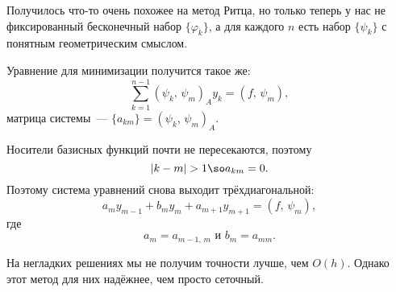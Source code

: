 \documentclass{trlnotes}
\begin{document}
    Получилось что-то очень похожее на метод Ритца, но только теперь у нас не фиксированный бесконечный набор $\{\varphi_k\}$, а для каждого $n$ есть набор $\{\psi_k\}$ с понятным геометрическим смыслом.

    Уравнение для минимизации получится такое же:
    \[
        \sum\limits_{k = 1}^{n - 1}(\psi_k, \, \psi_m)_A y_k = (f, \, \psi_m),
    \]
    матрица системы~--- $\{a_{km}\} = (\psi_k, \, \psi_m)_A$.

    Носители базисных функций почти не пересекаются, поэтому
    \[
        |k - m| > 1 \so a_{km} = 0.
    \]
    Поэтому система уравнений снова выходит трёхдиагональной:
    \[
        a_m y_{m - 1} + b_m y_m + a_{m + 1} y_{m + 1} = (f, \, \psi_m),
    \]
    где
    \[
        a_m = a_{m-1, \, m} \text{ и } b_m = a_{mm}.
    \]

    На негладких решениях мы не получим точности лучше, чем $O(h)$. Однако этот метод для них надёжнее, чем просто сеточный.
\end{document}
